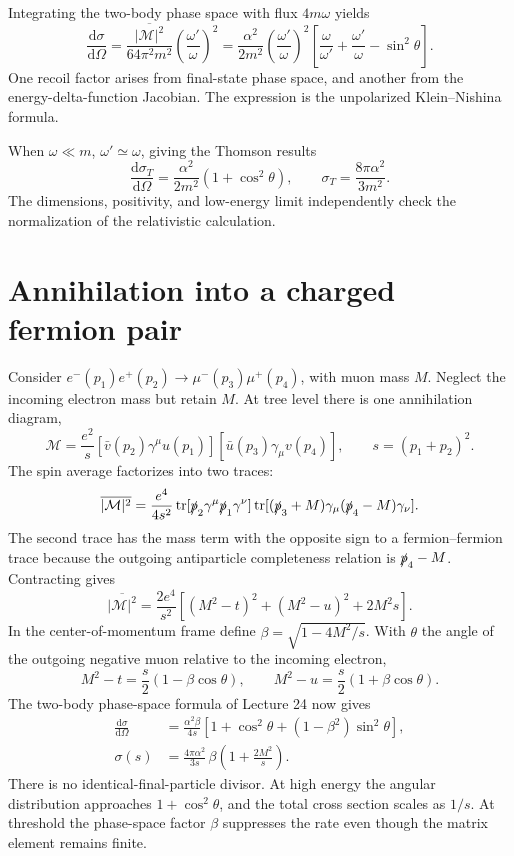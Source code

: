 \documentclass[11pt]{article}
\newcommand{\dd}{\mathrm d}
\newcommand{\tr}{\operatorname{tr}}
\newcommand{\module}[1]{\clearpage\section{#1}}
\newcommand{\cM}{\mathcal M}
\begin{document}
Integrating the two-body phase space with flux \(4m\omega\) yields
\begin{equation}
 \frac{\dd\sigma}{\dd\Omega}
 =\frac{\overline{|\cM|^2}}{64\pi^2m^2}
 \left(\frac{\omega'}{\omega}\right)^2
 =\frac{\alpha^2}{2m^2}\left(\frac{\omega'}{\omega}\right)^2
 \left[\frac{\omega}{\omega'}+\frac{\omega'}{\omega}-\sin^2\theta\right].
\end{equation}
One recoil factor arises from final-state phase space, and another from
the energy-delta-function Jacobian. The expression is the unpolarized
Klein--Nishina formula.

When \(\omega\ll m\), \(\omega'\simeq\omega\), giving the Thomson results
\begin{equation}
 \frac{\dd\sigma_T}{\dd\Omega}=\frac{\alpha^2}{2m^2}(1+\cos^2\theta),
 \qquad \sigma_T=\frac{8\pi\alpha^2}{3m^2}.
\end{equation}
The dimensions, positivity, and low-energy limit independently check the
normalization of the relativistic calculation.

\module{Annihilation into a charged fermion pair}
Consider \(e^-(p_1)e^+(p_2)\to\mu^-(p_3)\mu^+(p_4)\), with muon mass
\(M\). Neglect the incoming electron mass but retain \(M\). At tree level
there is one annihilation diagram,
\begin{equation}
 \cM=\frac{e^2}{s}
 [\bar v(p_2)\gamma^\mu u(p_1)]
 [\bar u(p_3)\gamma_\mu v(p_4)],\qquad s=(p_1+p_2)^2.
\end{equation}
The spin average factorizes into two traces:
\begin{equation}
 \overline{|\cM|^2}=\frac{e^4}{4s^2}
 \tr[\slashed p_2\gamma^\mu\slashed p_1\gamma^\nu]
 \tr[(\slashed p_3+M)\gamma_\mu(\slashed p_4-M)\gamma_\nu].
\end{equation}
The second trace has the mass term with the opposite sign to a
fermion--fermion trace because the outgoing antiparticle completeness
relation is \(\slashed p_4-M\). Contracting gives
\begin{equation}
 \overline{|\cM|^2}
 =\frac{2e^4}{s^2}\left[(M^2-t)^2+(M^2-u)^2+2M^2s\right].
\end{equation}
In the center-of-momentum frame define
\(\beta=\sqrt{1-4M^2/s}\). With \(\theta\) the angle of the outgoing
negative muon relative to the incoming electron,
\begin{equation}
 M^2-t=\frac{s}{2}(1-\beta\cos\theta),\qquad
 M^2-u=\frac{s}{2}(1+\beta\cos\theta).
\end{equation}
The two-body phase-space formula of Lecture 24 now gives
\begin{align}
 \frac{\dd\sigma}{\dd\Omega}
 &=\frac{\alpha^2\beta}{4s}
 \left[1+\cos^2\theta+(1-\beta^2)\sin^2\theta\right],\\
 \sigma(s)&=\frac{4\pi\alpha^2}{3s}\,
 \beta\left(1+\frac{2M^2}{s}\right).
 \label{eq:paircross}
\end{align}
There is no identical-final-particle divisor. At high energy the angular
distribution approaches \(1+\cos^2\theta\), and the total cross section
scales as \(1/s\). At threshold the phase-space factor \(\beta\) suppresses
the rate even though the matrix element remains finite.
\end{document}
